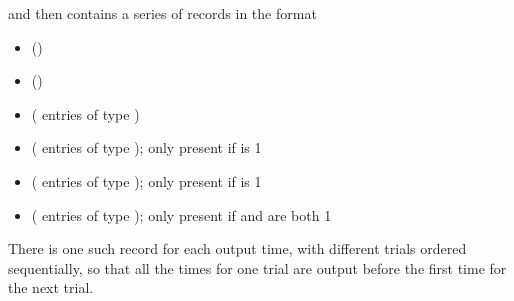 \documentclass[letterpaper,10pt,english]{sphinxmanual}
\begin{document}
and then contains a series of records in the format
\begin{itemize}
\item {} 
 ()

\item {} 
 ()

\item {} 
 ( entries of type )

\item {} 
 ( entries of type ); only present if  is 1

\item {} 
 ( entries of type ); only present if  is 1

\item {} 
 ( entries of type ); only present if  and  are both 1

\end{itemize}

There is one such record for each output time, with different trials ordered sequentially, so that all the times for one trial are output before the first time for the next trial.
\end{document}
